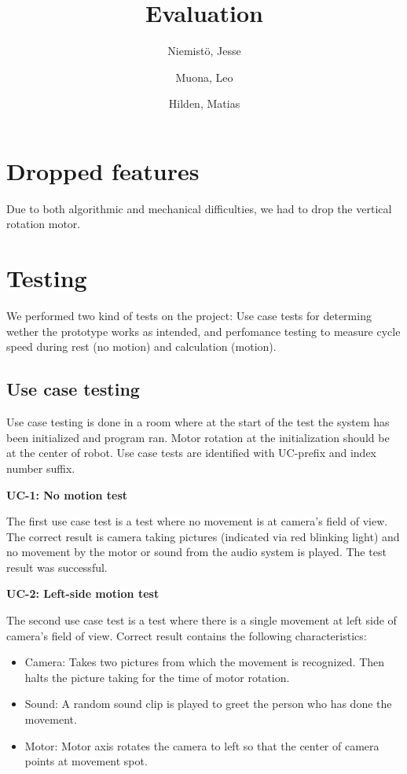 \documentclass[english,11pt,twoside,a4paper]{article}
\begin{document}
\author{
  Niemistö, Jesse
  \and
  Muona, Leo
  \and
  Hilden, Matias
}
\title{Evaluation}

\maketitle

\section{Dropped features}

Due to both algorithmic and mechanical difficulties, we had to drop the vertical rotation motor.

\section{Testing}

We performed two kind of tests on the project: Use case tests for determing wether the prototype works as intended, and perfomance testing to measure cycle speed during rest (no motion) and calculation (motion).

\subsection{Use case testing}

Use case testing is done in a room where at the start of the test the system has been initialized and program ran. Motor rotation at the initialization should be at the center of robot. Use case tests are identified with UC-prefix and index number suffix.

\textbf{UC-1: No motion test}

The first use case test is a test where no movement is at camera's field of view. The correct result is camera taking pictures (indicated via red blinking light) and no movement by the motor or sound from the audio system is played. The test result was successful. 

\textbf{UC-2: Left-side motion test}

The second use case test is a test where there is a single movement at left side of camera's field of view. Correct result contains the following characteristics:

\begin{itemize}
  \item Camera: Takes two pictures from which the movement is recognized. Then halts the picture taking for the time of motor rotation.
  \item Sound: A random sound clip is played to greet the person who has done the movement.
  \item Motor: Motor axis rotates the camera to left so that the center of camera points at movement spot.
\end{itemize}
\end{document}
